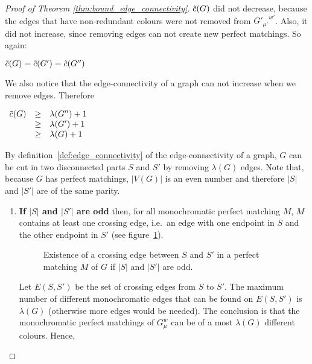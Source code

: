 \begin{proof}[Proof of Theorem \ref{thm:bound_edge_connectivity}]
    $\Tilde{c}(G)$ did not decrease, because the edges that have non-redundant colours were not removed from ${G'_{\mu'}}^{w'}$.
    Also, it did not increase, since removing edges can not create new perfect matchings.
    So again:
    
    \begin{center}
        $\Tilde{c}(G) = \Tilde{c}(G') = \Tilde{c}(G'')$
    \end{center}
    
    We also notice that the edge-connectivity of a graph can not increase when we remove edges.
    Therefore
    
    \begin{center}
        $\begin{array}{l c l}
            \Tilde{c}(G) & \geq & \lambda(G'') + 1 \\
                         & \geq & \lambda(G') + 1 \\
                         & \geq & \lambda(G) + 1
        \end{array}$
    \end{center}
    
    By definition~\ref{def:edge_connectivity} of the edge-connectivity of a graph, $G$ can be cut in two disconnected parts $S$ and $S'$ by removing $\lambda(G)$ edges.
    Note that, because $G$ has perfect matchings, $|V(G)|$ is an even number and therefore $|S|$ and $|S'|$ are of the same parity.
    
    \begin{enumerate}
        \item 
            \textbf{If $|S|$ and $|S'|$ are odd} then, for all monochromatic perfect matching $M$, $M$ contains at least one crossing edge, i.e.\ an edge with one endpoint in $S$ and the other endpoint in $S'$ (see figure~\ref{fig:proof_lambda_odd}).
            
            \begin{figure}[H]
                \caption{Existence of a crossing edge between $S$ and $S'$ in a perfect matching $M$ of $G$ if $|S|$ and $|S'|$ are odd.}
                \label{fig:proof_lambda_odd}
            \end{figure}
            
            Let $E(S, S')$ be the set of crossing edges from $S$ to $S'$.
            The maximum number of different monochromatic edges that can be found on $E(S, S')$ is $\lambda(G)$ (otherwise more edges would be needed).
            The conclusion is that the monochromatic perfect matchings of $G_\mu^w$ can be of a most $\lambda(G)$ different colours.
            Hence,
            

\end{enumerate}
\end{proof}
